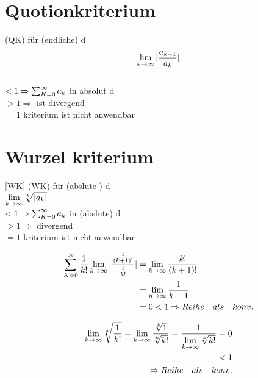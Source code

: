 \section{Quotionkriterium}
(QK) für (endliche) d\\
\[\lim\limits_{k \rightarrow \infty} |\frac{a_{k+1}}{a_k}|\] \\$< 1 \Rightarrow \sum_{K=0}^{\infty} a_k $ in absolut d\\
$>1 \Rightarrow $ ist divergend\\
$=1 $ kriterium ist nicht anwendbar 
\section{Wurzel kriterium}[WK]
(WK) für (abslute ) d
\\ $\lim\limits_{k \rightarrow \infty} \sqrt[k]{|a_k|}$\\
$<1 \Rightarrow \sum_{K=0}^{\infty} a_k$ in (abslute) d\\
$>1 \Rightarrow$ divergend\\
$=1 $ kriterium ist nicht anwendbar
\begin{example}[QK]
	\begin{equation*}
	\begin{split}
	\sum_{K=0}^{\infty} \frac{1}{k!}
	\lim\limits_{k \rightarrow \infty} |\frac{\frac{1}{(k+1)!}}{\frac{1}{k!}}| &= \lim\limits_{k \rightarrow \infty} \frac{k!}{(k+1)!} \\
	&=\lim\limits_{n \rightarrow \infty} \frac{1}{k+1}   \\
	&=0<1 \Rightarrow  Reihe \quad als \quad konv. 
	\end{split}	 
	\end{equation*}     
	
\end{example}
\begin{example}[WK]
	\begin{equation*}
	\begin{split}
	\lim\limits_{k \rightarrow \infty} \sqrt[k]{\frac{1}{k!}}= \lim\limits_{k \rightarrow \infty} \frac{\sqrt[k]{1}}{\sqrt[k]{k!}}=\frac{1}{\lim\limits_{k \rightarrow \infty} \sqrt[k]{k!}}=0\\ <1 \\
	\Rightarrow Reihe \quad als \quad konv.
	\end{split}	 
	\end{equation*}     
	
\end{example}